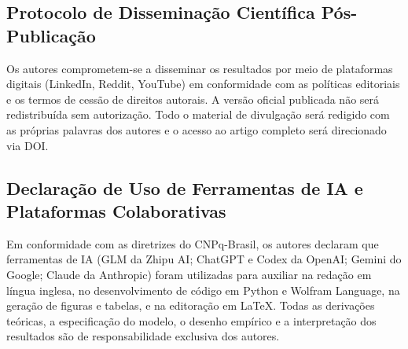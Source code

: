 \documentclass[12pt,a4paper]{article}
\theoremstyle{definition}
\theoremstyle{plain}
\begin{document}
\subsection*{Protocolo de Disseminação Científica Pós-Publicação}

Os autores comprometem-se a disseminar os resultados por meio de plataformas digitais (LinkedIn, Reddit, YouTube) em conformidade com as políticas editoriais e os termos de cessão de direitos autorais. A versão oficial publicada não será redistribuída sem autorização. Todo o material de divulgação será redigido com as próprias palavras dos autores e o acesso ao artigo completo será direcionado via DOI.

\subsection*{Declaração de Uso de Ferramentas de IA e Plataformas Colaborativas}

Em conformidade com as diretrizes do CNPq-Brasil, os autores declaram que ferramentas de IA (GLM da Zhipu AI; ChatGPT e Codex da OpenAI; Gemini do Google; Claude da Anthropic) foram utilizadas para auxiliar na redação em língua inglesa, no desenvolvimento de código em Python e Wolfram Language, na geração de figuras e tabelas, e na editoração em \LaTeX{}. Todas as derivações teóricas, a especificação do modelo, o desenho empírico e a interpretação dos resultados são de responsabilidade exclusiva dos autores.

\end{document}

